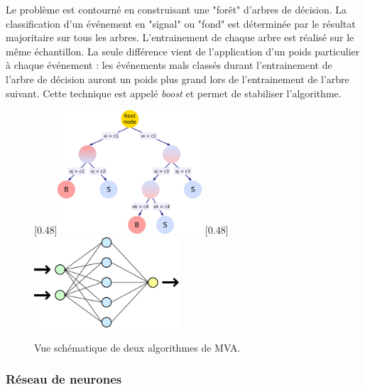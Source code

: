 Le problème est contourné en construisant une "forêt" d'arbres de décision. La classification d'un événement en "signal" ou "fond" est déterminée par le résultat majoritaire sur tous les arbres. L'entrainement de chaque arbre est réalisé sur le même échantillon. La seule différence vient de l'application d'un poids particulier à chaque événement : les événements mals classés durant l'entrainement de l'arbre de décision auront un poids plus grand lors de l'entrainement de l'arbre suivant. Cette technique est appelé \emph{boost} \citep{Freund1997119} et permet de stabiliser l'algorithme.

\begin{figure}[t!] \centering
    [0.48\textwidth]{\includegraphics[width=0.48\textwidth]{chapitre6/figs/BDT.pdf}} \hfill
    [0.48\textwidth]{\includegraphics[width=0.48\textwidth]{chapitre6/figs/Neural_network.pdf}}
    \caption{Vue schématique de deux algorithmes de MVA.}
\end{figure}

\subsubsection{Réseau de neurones}

